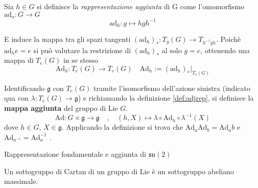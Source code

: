 \begin{definition}\label{def:adjrep}
   Sia $h \in G$ si definisce la \emph{rappresentazione aggiunta} di G come
   l'omomorfismo $ \mathrm{ad}_a : G \to G $
   $$
      \mathrm{ad}_h : g \mapsto h g h^{-1}
   $$
\end{definition}

E induce la mappa tra gli spazi tangenti $(\mathrm{ad}_h)_* : T_g(G) \to T_{h^{-1}gh}$.
Poichè $\mathrm{ad}_h e = e$ si può valutare la restrizione di $(\mathrm{ad}_h)_*$ al solo $g=e$,
ottenendo una mappa di $T_e(G)$ in se stesso
$$
   \mathrm{Ad}_h : T_e(G) \to T_e(G) \quad \mathrm{Ad}_h := (\mathrm{ad}_h)_* |_{T_e(G)}
$$

\begin{definition}
   Identificando $\mathfrak{g}$ con $T_e(G)$ tramite l'isomorfismo dell'azione sinistra
   (indicato qua con $\lambda : T_e(G) \to \mathfrak{g}$) e richiamando la definizione
   \ref{def:adjrep}, si definisce la \textbf{mappa aggiunta} del gruppo di Lie $G$.
   $$
      \mathrm{Ad} : G \times \mathfrak{g} \to \mathfrak{g} \quad , \quad
      (h,X) \mapsto \lambda \circ \mathrm{Ad}_h \circ \lambda^{-1}(X)
   $$
   dove $h \in G$, $X \in \mathfrak{g}$.
   Applicando la definizione si trova che $\mathrm{Ad}_a \mathrm{Ad}_b =
   \mathrm{Ad}_ab$ e $\mathrm{Ad}_{a^{-1}} = \mathrm{Ad}_a^{-1}$ .\\
\end{definition}

\begin{example}
   Rappresentazione fondamentale e aggiunta di $\mathfrak{su(2)}$
\end{example}

Un sottogruppo di Cartan di un gruppo di Lie è un sottogruppo abeliano massimale.
